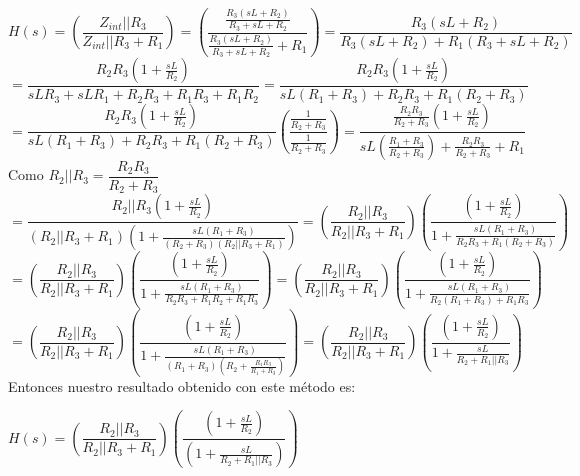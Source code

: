\documentclass[12pt,a4paper]{article}
\begin{document}
\begin{center}
$H(s)= \left(\dfrac{Z_{int}||R_{3}}{Z_{int}||R_{3} + R_{1}}\right) = \left(\dfrac{\frac{R_{3}(sL + R_{2})}{R_{3}+sL+R_{2}}}{\frac{R_{3}(sL + R_{2})}{R_{3}+sL+R_{2}} + R_{1}}\right) = \dfrac{R_{3}(sL+R_{2})}{R_{3}(sL + R_{2}) + R_{1}(R_{3}+sL+R_{2})}$\\[12pt]
$=\dfrac{R_{2}R_{3}(1+\frac{sL}{R_{2}})}{sLR_{3} + sLR_{1} + R_{2}R_{3} + R_{1}R_{3}+R_{1}R_{2}}=\dfrac{R_{2}R_{3}(1+\frac{sL}{R_{2}})}{sL(R_{1}+R_{3}) + R_{2}R_{3} + R_{1}(R_{2}+R_{3})}$\\[12pt]
$=\dfrac{R_{2}R_{3}(1+\frac{sL}{R_{2}})}{sL(R_{1}+R_{3}) + R_{2}R_{3} + R_{1}(R_{2}+R_{3})}\left(\dfrac{\frac{1}{R_{2} + R_{3}}}{\frac{1}{R_{2} + R_{3}}}\right)=\dfrac{\frac{R_{2}R_{3}}{R_{2}+R_{3}}(1+\frac{sL}{R_{2}})}{sL(\frac{R_{1} +R_{3}}{R_{2}+R_{3}})+ \frac{R_{2}R_{3}}{R_{2} + R_{3}} + R_{1}}$\\[12pt]
Como $R_{2}||R_{3} = \dfrac{R_{2}R_{3}}{R_{2}+R_{3}}$\\[12pt]
$=\dfrac{R_{2}||R_{3}(1+\frac{sL}{R_{2}})}{(R_{2}||R_{3}+R_{1})(1+\frac{sL(R_{1}+R_{3})}{(R_{2}+R_{3})(R_{2}||R_{3}+R_{1})})}=\left(\dfrac{R_{2}||R_{3}}{R_{2}||R_{3}+R_{1}}\right)\left(\dfrac{(1+\frac{sL}{R_{2}})}{1+\frac{sL(R_{1}+R_{3})}{R_{2}R_{3}+R_{1}(R_{2}+R_{3})}}\right)$\\[12pt]
$=\left(\dfrac{R_{2}||R_{3}}{R_{2}||R_{3}+R_{1}}\right)\left(\dfrac{(1+\frac{sL}{R_{2}})}{1+\frac{sL(R_{1}+R_{3})}{R_{2}R_{3}+R_{1}R_{2}+R_{1}R_{3}}}\right)=\left(\dfrac{R_{2}||R_{3}}{R_{2}||R_{3}+R_{1}}\right)\left(\dfrac{(1+\frac{sL}{R_{2}})}{1+\frac{sL(R_{1}+R_{3})}{R_{2}(R_{1}+R_{3})+R_{1}R_{3}}}\right)$\\[12pt]
$=\left(\dfrac{R_{2}||R_{3}}{R_{2}||R_{3}+R_{1}}\right)\left(\dfrac{(1+\frac{sL}{R_{2}})}{1+\frac{sL(R_{1}+R_{3})}{(R_{1}+R_{3})(R_{2}+\frac{R_{1}R_{3}}{R_{1}+R_{3}})}}\right)=\left(\dfrac{R_{2}||R_{3}}{R_{2}||R_{3}+R_{1}}\right)\left(\dfrac{(1+\frac{sL}{R_{2}})}{1+\frac{sL}{R_{2}+R_{1}||R_{3}}}\right)$\\[12pt]
Entonces nuestro resultado obtenido con este método es:\\
\begin{center}
$H(s)=\left(\dfrac{R_{2}||R_{3}}{R_{2}||R_{3}+R_{1}}\right)\left(\dfrac{(1+\frac{sL}{R_{2}})}{(1+\frac{sL}{R_{2}+R_{1}||R_{3}})}\right)$
\end{center}
\end{center}
\end{document}
